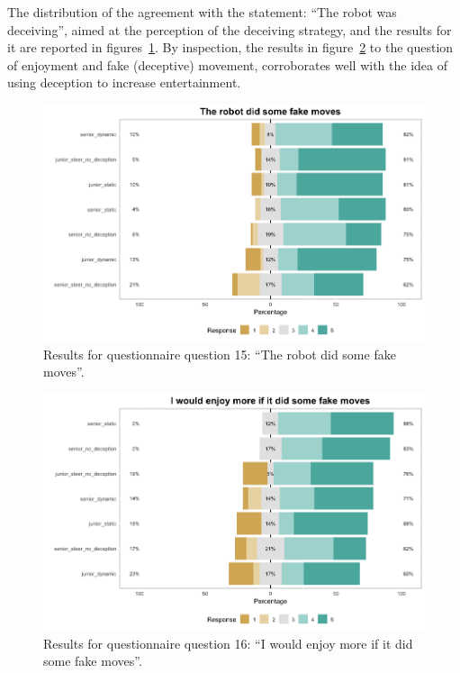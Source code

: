 The distribution of the agreement with the statement: ``The robot was deceiving'', aimed at the perception of the deceiving strategy, and the results for it are reported in figures~\ref{fig:q15}. By inspection, the results in figure~\ref{fig:q16} to the question of enjoyment and fake (deceptive) movement, corroborates well with the idea of using deception to increase entertainment.

\begin{figure}[h]
    \centering
    \includegraphics[draft=false, width=\linewidth]{images/06-deception/Q15}
    \caption{Results for questionnaire question 15: ``The robot did some fake moves''.}
    \label{fig:q15}
\end{figure}

\begin{figure}[h]
    \centering
    \includegraphics[draft=false, width=\linewidth]{images/06-deception/Q16}
    \caption{Results for questionnaire question 16: ``I would enjoy more if it did some fake moves''.}
    \label{fig:q16}
\end{figure}


